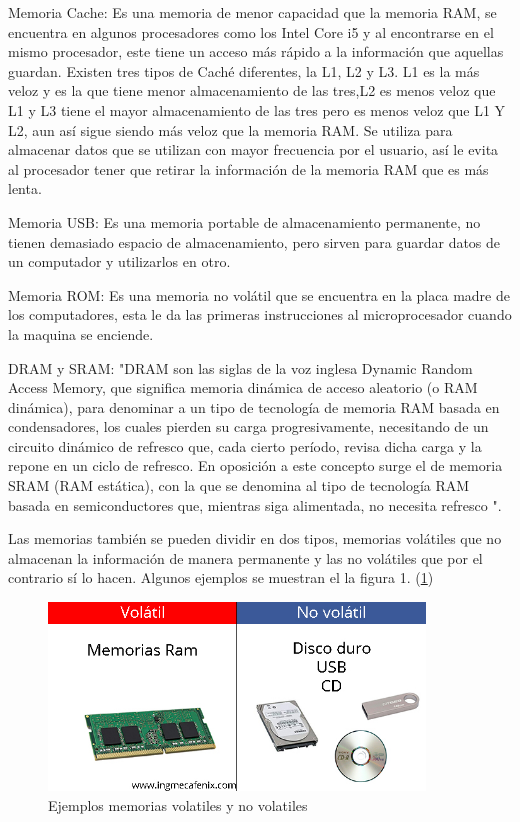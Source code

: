 \documentclass{article}
\begin{document}
Memoria Cache: Es una memoria de menor capacidad que la memoria RAM, se encuentra en algunos procesadores como los Intel Core i5 y al encontrarse en el mismo procesador, este tiene un acceso más rápido a la información que aquellas guardan. Existen tres tipos de Caché diferentes, la L1, L2 y L3. L1 es la más veloz y es la que tiene menor almacenamiento de las tres,L2 es menos veloz que L1 y L3 tiene el mayor almacenamiento de las tres pero es menos veloz que L1 Y L2, aun así sigue siendo más veloz que la memoria RAM. Se utiliza para almacenar datos que se utilizan con mayor frecuencia por el usuario, así le evita al procesador tener que retirar la información de la memoria RAM que es más lenta\cite{YouBioit}.

Memoria USB: Es una memoria portable de almacenamiento permanente, no tienen demasiado espacio de almacenamiento, pero sirven para guardar datos de un computador y utilizarlos en otro.

Memoria ROM: Es una memoria no volátil que se encuentra en la placa madre de los computadores, esta le da las primeras instrucciones al microprocesador cuando la maquina se enciende\cite{YouBioit}.

DRAM y SRAM: "DRAM son las siglas de la voz inglesa Dynamic Random Access Memory, que significa memoria dinámica de acceso aleatorio (o RAM dinámica), para denominar a un tipo de tecnología de memoria RAM basada en condensadores, los cuales pierden su carga progresivamente, necesitando de un circuito dinámico de refresco que, cada cierto período, revisa dicha carga y la repone en un ciclo de refresco. En oposición a este concepto surge el de memoria SRAM (RAM estática), con la que se denomina al tipo de tecnología RAM basada en semiconductores que, mientras siga alimentada, no necesita refresco \cite{mateoa-volta}". 

Las memorias también se pueden dividir en dos tipos, memorias volátiles que no almacenan la información de manera permanente y las no volátiles que por el contrario sí lo hacen. Algunos ejemplos se muestran el la figura 1. (\ref{fig:Volatilidad})\\

\begin{figure}[h]
\includegraphics[width=10cm]{Volatilidad.jpg}
\centering
\caption{Ejemplos memorias volatiles y no volatiles}
\label{fig:Volatilidad}
\end{figure}
\end{document}
